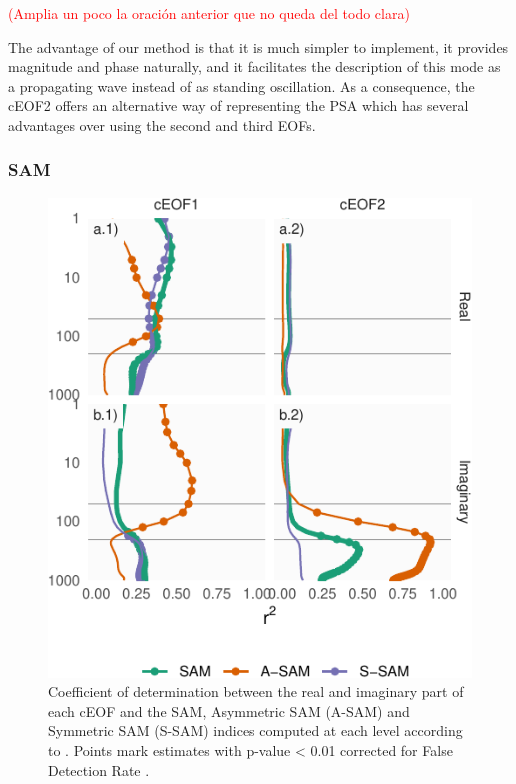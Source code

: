 \documentclass[smallextended]{svjour3}       %
\begin{document}
\textcolor{red}{(Amplia un poco la oración anterior que no queda del todo clara)}

The advantage of our method is that it is much simpler to implement, it provides magnitude and phase naturally, and it facilitates the description of this mode as a propagating wave instead of as standing oscillation. As a consequence, the cEOF2 offers an alternative way of representing the PSA which has several advantages over using the second and third EOFs.

\hypertarget{sam}{%
\subsubsection{SAM}\label{sam}}



\begin{figure}
\centering
\includegraphics{../figures/sam-eof-vertical-1.pdf}
\caption{\label{fig:sam-eof-vertical}Coefficient of determination between the real and imaginary part of each cEOF and the SAM, Asymmetric SAM (A-SAM) and Symmetric SAM (S-SAM) indices computed at each level according to \citet{campitelli2021}. Points mark estimates with p-value \textless{} 0.01 corrected for False Detection Rate \citep{benjamini1995}.}
\end{figure}
\end{document}
